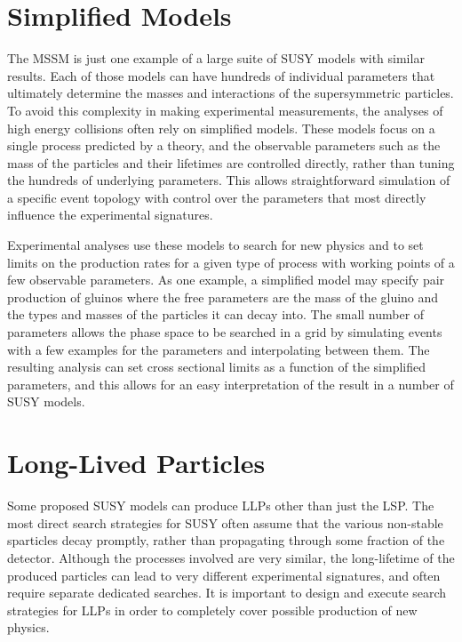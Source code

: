 \section{Simplified Models}

The \ac{MSSM} is just one example of a large suite of \ac{SUSY} models with similar results.
Each of those models can have hundreds of individual parameters that ultimately determine the masses and interactions of the supersymmetric particles.
To avoid this complexity in making experimental measurements, the analyses of high energy collisions often rely on simplified models.
These models focus on a single process predicted by a theory, and the observable parameters such as the mass of the particles and their lifetimes are controlled directly, rather than tuning the hundreds of underlying parameters.
This allows straightforward simulation of a specific event topology with control over the parameters that most directly influence the experimental signatures.

Experimental analyses use these models to search for new physics and to set limits on the production rates for a given type of process with working points of a few observable parameters.
As one example, a simplified model may specify pair production of gluinos where the free parameters are the mass of the gluino and the types and masses of the particles it can decay into.
The small number of parameters allows the phase space to be searched in a grid by simulating events with a few examples for the parameters and interpolating between them.
The resulting analysis can set cross sectional limits as a function of the simplified parameters, and this allows for an easy interpretation of the result in a number of \ac{SUSY} models.

\section{Long-Lived Particles}
\label{sec:llp_theory}

Some proposed \ac{SUSY} models can produce \acp{LLP} other than just the \ac{LSP}.
The most direct search strategies for \ac{SUSY} often assume that the various non-stable sparticles decay promptly, rather than propagating through some fraction of the detector.
Although the processes involved are very similar, the long-lifetime of the produced particles can lead to very different experimental signatures, and often require separate dedicated searches.
It is important to design and execute search strategies for \acp{LLP} in order to completely cover possible production of new physics. 


